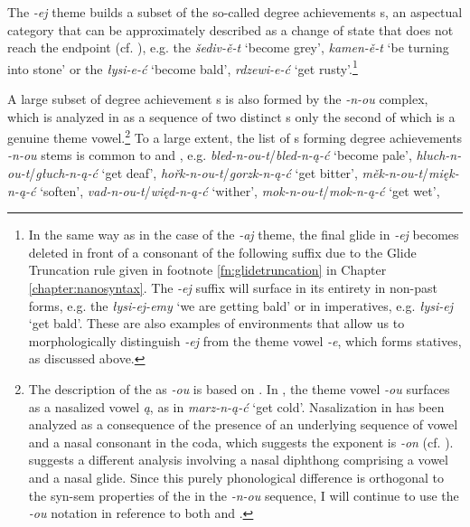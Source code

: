 \noindent
The \textit{-ej} theme  builds a subset of the so-called  degree achievements s, an aspectual category that can be approximately described as a change of state that does not reach the endpoint (cf. \citealt{dowty79,hklevin1999,rothstein2004}), e.g. the  \textit{\v{s}ediv-\v{e}-t} `become grey', \textit{kamen-\v{e}-t} `be turning into stone' or the  \textit{\l ysi-e-\'c} `become bald', \textit{rdzewi-e-\'c} `get rusty'.\footnote{In the same way as in the case of the \textit{-aj} theme, the final glide in \textit{-ej} becomes deleted in front of a consonant of the following suffix due to the Glide Truncation rule given in  footnote \ref{fn:glidetruncation} in Chapter \ref{chapter:nanosyntax}. The \textit{-ej} suffix will surface in its entirety in non-past forms, e.g. the  \textit{\l ysi-ej-emy} `we are getting bald' or in imperatives, e.g. \textit{\l ysi-ej} `get bald'. These are also examples of environments that allow us to morphologically distinguish \textit{-ej} from the theme  vowel \textit{-e}, which forms statives, as discussed above. 
} %
\par
A large subset of degree achievement s is also formed by the \textit{-n-ou} complex, which is analyzed in \cite{NU} as a sequence of two distinct s only the second of which is a genuine theme vowel.\footnote{The description of the  as \textit{-ou} is based on . In , the theme vowel \textit{-ou} surfaces as a nasalized vowel \textit{\k{a}}, as in \textit{marz-n-\k{a}-\'c} `get cold'. Nasalization in  has been analyzed as a consequence of  the presence of an underlying sequence of vowel and a nasal consonant in the coda, which suggests the  exponent is \textit{-on} (cf. \citealt{Guss1980,Rubach1984}). \cite{czayk1988} suggests a different analysis involving a nasal diphthong comprising  a vowel and a nasal glide. Since this purely phonological difference is orthogonal to the syn-sem properties of the  in the \textit{-n-ou} sequence, I will continue to use the \textit{-ou} notation in reference to both  and . 
} %
To a large extent, the list of s forming  degree achievements \textit{-n-ou} stems is common to  and , e.g. \textit{bled-n-ou-t}/\textit{bled-n-\k{a}-\'c} `become pale', \textit{hluch-n-ou-t}/\textit{g\l uch-n-\k{a}-\'c} `get deaf', \textit{ho\v{r}k-n-ou-t}/\textit{gorzk-n-\k{a}-\'c} `get bitter', \textit{m\v{e}k-n-ou-t}/\textit{mi\k{e}k-n-\k{a}-\'c} `soften', \textit{vad-n-ou-t}/\textit{wi\k{e}d-n-\k{a}-\'c} `wither', \textit{mok-n-ou-t}/\textit{mok-n-\k{a}-\'c} `get wet', 
